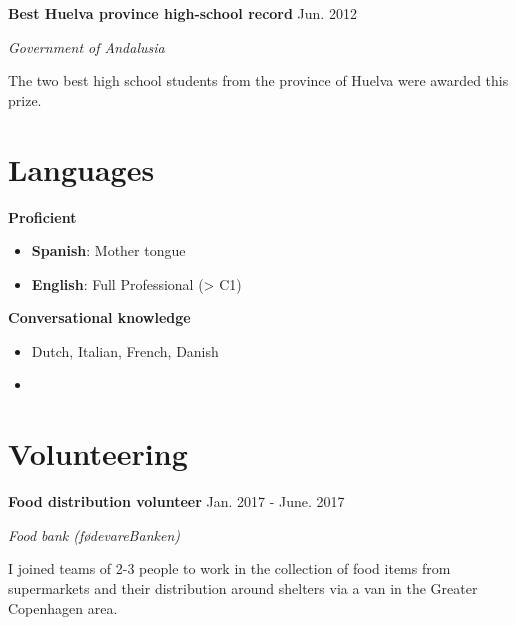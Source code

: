 \documentclass[paper=a4,fontsize=11pt]{article}
\newcommand{\NewPart}[1]{
\vspace{-15pt}
\section*{
{#1}}}
\newcommand{\Entry}[4]{
		\noindent \textbf{#1} \hfill      %
		{\color{gray}\textsf{#2}} \par                  %
		\noindent \textit{#3} \par        %
		  \noindent \small #4  %
		\normalsize \par \vspace{7.5pt}}
\begin{document}
\Entry{Best Huelva province high-school record}{Jun. 2012}{Government of Andalusia}{The two best high school students from the province of Huelva were awarded this prize.}




\NewPart{Languages}



\begin{minipage}[l]{0.35\textwidth}
    \textbf{Proficient}
  \begin{itemize}[leftmargin=5pt]
    \setlength\itemsep{0.05pt}
    \item[] \textbf{Spanish}: Mother tongue
    \item[] \textbf{English}: Full Professional (> C1)
  \end{itemize}
\end{minipage} %
\begin{minipage}[r]{0.65\textwidth}
  \textbf{Conversational knowledge}
  \begin{itemize}[leftmargin=5pt]
    \setlength\itemsep{0.05pt}
    \item[] Dutch, Italian, French, Danish
    \item[] 
  \end{itemize}
\end{minipage}

\vspace{0.5cm}




\NewPart{Volunteering}

\Entry{Food distribution volunteer}{Jan. 2017 - June. 2017}{Food bank (f{\o}devareBanken)}{I joined teams of 2-3 people to work in the collection of food items from supermarkets and their distribution around shelters via a van in the Greater Copenhagen area.}

\end{document}
